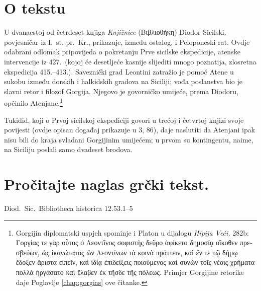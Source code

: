 

\section*{O tekstu}

U dvanaestoj od četrdeset knjiga \textit{Knjižnice} \textgreek{(Βιβλιοθήκη)} Diodor Sicilski, povjesničar iz I.~st. pr.~Kr., prikazuje, između ostalog, i Peloponeski rat. Ovdje odabrani odlomak pripovijeda o pokretanju Prve sicilske ekspedicije, atenske intervencije iz 427.\ (kojoj će desetljeće kasnije slijediti mnogo poznatija, zlosretna ekspedicija 415.–413.). Saveznički grad Leontini zatražio je pomoć Atene u sukobu između dorskih i halkidskih gradova na Siciliji; vođa poslanstva bio je slavni retor i filozof Gorgija. Njegovo je govorničko umijeće, prema Diodoru, opčinilo Atenjane.\footnote{Gorgijin diplomatski uspjeh spominje i Platon u dijalogu \textit{Hipija Veći,} 282b: \textgreek{Γοργίας τε γὰρ οὗτος ὁ Λεοντῖνος σοφιστὴς δεῦρο ἀφίκετο δημοσίᾳ οἴκοθεν πρεσβεύων, ὡς ἱκανώτατος ὢν Λεοντίνων τὰ κοινὰ πράττειν, καὶ ἔν τε τῷ δήμῳ ἔδοξεν ἄριστα εἰπεῖν, καὶ ἰδίᾳ ἐπιδείξεις ποιούμενος καὶ συνὼν τοῖς νέοις χρήματα πολλὰ ἠργάσατο καὶ ἔλαβεν ἐκ τῆσδε τῆς πόλεως.} Primjer Gorgijine retorike daje Poglavlje \ref{chap:gorgias} ove čitanke.}

Tukidid, koji o Prvoj sicilskoj ekspediciji govori u trećoj i četvrtoj knjizi svoje povijesti (ovdje opisan događaj prikazuje u 3, 86), daje naslutiti da Atenjani ipak nisu bili do kraja svladani Gorgijinim umijećem; u prvom su kontingentu, naime, na Siciliju poslali samo dvadeset brodova.


\section*{Pročitajte naglas grčki tekst.}

Diod.~Sic.\ Bibliotheca historica 12.53.1–5


\medskip



